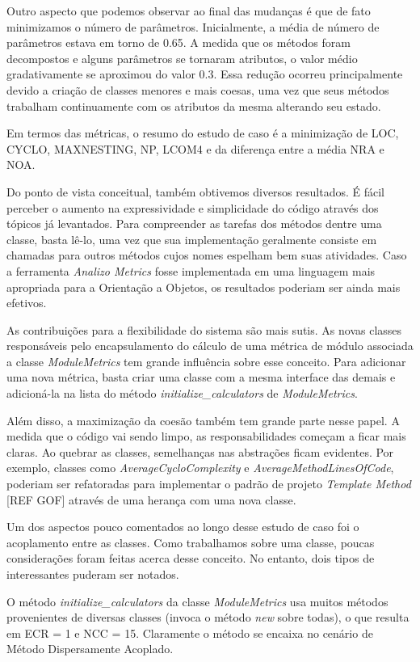 Outro aspecto que podemos observar ao final das mudanças é que de fato minimizamos
o número de parâmetros. Inicialmente, a média de número de parâmetros estava em torno de 0.65.
A medida que os métodos foram decompostos e alguns parâmetros se tornaram atributos, o valor médio
gradativamente se aproximou do valor 0.3. Essa redução ocorreu principalmente devido a criação
de classes menores e mais coesas, uma vez que seus métodos trabalham continuamente com os
atributos da mesma alterando seu estado.

Em termos das métricas, o resumo do estudo de caso é a minimização de LOC, CYCLO, MAXNESTING, NP,
LCOM4 e da diferença entre a média NRA e NOA.

Do ponto de vista conceitual, também obtivemos diversos resultados. É fácil perceber o aumento
na expressividade e simplicidade do código através dos tópicos já levantados. Para compreender
as tarefas dos métodos dentre uma classe, basta lê-lo, uma vez que sua implementação geralmente
consiste em chamadas para outros métodos cujos nomes espelham bem suas atividades. Caso a ferramenta
\textit{Analizo Metrics} fosse implementada em uma linguagem mais apropriada para a Orientação
a Objetos, os resultados poderiam ser ainda mais efetivos.

As contribuições para a flexibilidade do sistema são mais sutis. As novas classes responsáveis
pelo encapsulamento do cálculo de uma métrica de módulo associada a classe \textit{ModuleMetrics}
tem grande influência sobre esse conceito. Para adicionar uma nova métrica, basta criar uma classe
com a mesma interface das demais e adicioná-la na lista do método \textit{initialize\_calculators} de
\textit{ModuleMetrics}.

Além disso, a maximização da coesão também tem grande parte nesse papel. A medida que o código
vai sendo limpo, as responsabilidades começam a ficar mais claras. Ao quebrar as classes,
semelhanças nas abstrações ficam evidentes. Por exemplo, classes como \textit{AverageCycloComplexity}
e \textit{AverageMethodLinesOfCode}, poderiam ser refatoradas para implementar o padrão de projeto
\textit{Template Method} [REF GOF] através de uma herança com uma nova classe.

Um dos aspectos pouco comentados ao longo desse estudo de caso foi o acoplamento entre as classes.
Como trabalhamos sobre uma classe, poucas considerações foram feitas acerca desse conceito. No
entanto, dois tipos de interessantes puderam ser notados.

O método \textit{initialize\_calculators} da classe \textit{ModuleMetrics} usa muitos métodos
provenientes de diversas classes (invoca o método \textit{new} sobre todas), o que resulta em ECR = 1 e NCC = 15.
Claramente o método se encaixa no cenário de Método Dispersamente Acoplado.

